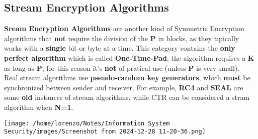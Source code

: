 \subsection{Stream Encryption Algorithms}
\begin{minipage}{0.6\textwidth}
\textbf{Sream Encryption Algorithms} are another kind of Symmetric Encryption algorithms that \textbf{not} require the division of the \textbf{P} in blocks, as they tipically works with a \textbf{single} bit or byte at a time. This category contains the \textbf{only perfect algorithm} which is called \textbf{One-Time-Pad}: the algorithm requires a \textbf{K} as long as \textbf{P}, for this reason it's \textbf{not} of pratical use (unless \textbf{P} is very small).\\Real stream algorithms use \textbf{pseudo-random key generators}, which \textbf{must} be synchronized between sender and receiver. For example, \textbf{RC4} and \textbf{SEAL} are some \textbf{old}
instances of stream algorithms, while CTR can be considered a stram algorithm when \textbf{N=1}.
\end{minipage} 
\hspace{0.5cm}
\begin{minipage}{0.4\textwidth}
    \centering
    \texttt{[image: /home/lorenzo/Notes/Information System Security/images/Screenshot from 2024-12-28 11-20-36.png]}
\end{minipage}



